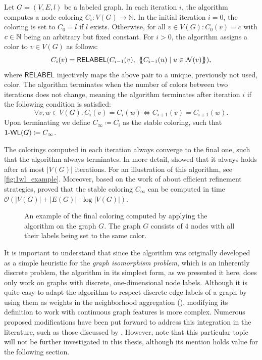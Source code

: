 \begin{definition}[$\wl$ Algorithm]
    Let $G = (V, E, l)$ be a labeled graph. In each iteration $i$, the \wl algorithm computes a node coloring $C_i: V(G) \rightarrow \mathbb{N}$. In the initial iteration $i=0$, the coloring is set to $C_0 = l$ if $l$ exists. Otherwise, for all $v \in V(G): C_0(v) = c$ with $c \in \mathbb{N}$ being an arbitrary but fixed constant. For $i > 0$, the algorithm assigns a color to $v \in V(G)$ as follows:
    \begin{equation*}
        C_i (v) = \textsf{RELABEL}(C_{i-1}(v),  \ \{\!\!\{ C_{i-1}(u) \mid u \in \mathcal{N}(v) \}\!\!\}),
    \end{equation*}
    where $\textsf{RELABEL}$ injectively maps the above pair to a unique, previously not used, color. The algorithm terminates when the number of colors between two iterations does not change, meaning the algorithm terminates after iteration $i$ if the following condition is satisfied:
    \begin{equation*}
        \forall v,w \in V(G):  C_i(v) = C_i(w) \iff C_{i+1}(v) = C_{i+1}(w).
    \end{equation*}
    Upon terminating we define $C_{\infty} \coloneqq C_i$ as the stable coloring, such that $\textsf{1-WL}(G) \coloneqq C_\infty$.
\end{definition}

The colorings computed in each iteration always converge to the final one, such that the algorithm always terminates. In more detail, \cite{Gro2017} showed that it always holds after at most $|V(G)|$ iterations. For an illustration of this algorithm, see \autoref{fig:1wl_example}. Moreover, based on the work of \cite{Pai+87} about efficient refinement strategies, \cite{Car+82} proved that the stable coloring $C_\infty$ can be computed in time $\mathcal{O}(| V(G) | + |E(G)| \cdot \log | V(G) |)$.

\begin{figure}[H]
    \centering
    
    \caption{An example of the final coloring computed by applying the \wl algorithm on the graph $G$. The graph $G$ consists of $4$ nodes with all their labels being set to the same color.}
    \label{fig:1wl_example}
\end{figure}

It is important to understand that since the algorithm was originally developed as a simple heuristic for the \textit{graph isomorphism problem}, which is an inherently discrete problem, the \wl algorithm in its simplest form, as we presented it here, does only work on graphs with discrete, one-dimensional node labels. Although it is quite easy to adapt the algorithm to respect discrete edge labels of a graph by using them as weights in the neighborhood aggregation (\cite{Shervashidze2011}), modifying its definition to work with continuous graph features is more complex. Numerous proposed modifications have been put forward to address this integration in the literature, such as those discussed by \cite{Mor+2016}. However, note that this particular topic will not be further investigated in this thesis, although its mention holds value for the following section.

